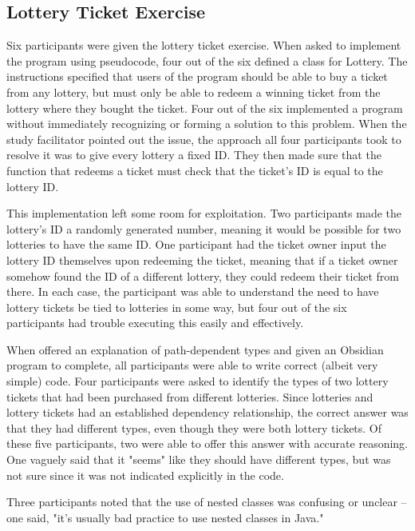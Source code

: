 \documentclass[sigplan,10pt,review]{acmart}\settopmatter{printfolios=true}
\begin{document}
\subsection{Lottery Ticket Exercise}	
	
Six participants were given the lottery ticket exercise. When asked to implement the program using pseudocode, four out of the six defined 
a class for Lottery. The instructions specified that users of the program should be able to buy a ticket from any lottery, but must only be 
able to redeem a winning ticket from the lottery where they bought the ticket. Four out of the six implemented a program without 
immediately recognizing or forming a solution to this problem. When the study facilitator pointed out the issue, the approach all four 
participants took to resolve it was to give every lottery a fixed ID. They then made sure that the function that redeems a ticket must check 
that the ticket's ID is equal to the lottery ID. 

This implementation left some room for exploitation. Two participants made the lottery's ID a randomly generated number, meaning it would be 
possible for two lotteries to have the same ID. One participant had the ticket owner input the lottery ID themselves upon redeeming 
the ticket, meaning that if a ticket owner somehow found the ID of a different lottery, they could redeem their ticket from there.
In each case, the participant was able to understand the need to have lottery tickets be tied to 
lotteries in some way, but four out of the six participants had trouble executing this easily and effectively. 

When offered an explanation of path-dependent types and given an Obsidian program to complete, all participants were able to write 
correct (albeit very simple) code. Four participants were asked to identify the types of two lottery tickets that had been purchased from different 
lotteries. Since lotteries and lottery tickets had an established dependency relationship, the correct answer was that they had different 
types, even though they were both lottery tickets. Of these five participants, two were able to offer this answer with accurate reasoning. 
One vaguely said that it "seems" like they should have different types, but was not sure since it was not indicated explicitly in the code. 

Three participants noted that the use of nested classes was confusing or unclear -- one said, "it's usually bad practice to use nested 
classes in Java."
\end{document}
